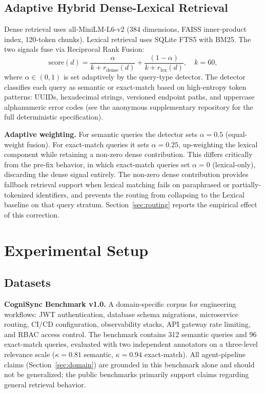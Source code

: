 \documentclass[sigconf]{acmart}
\begin{document}
\subsection{Adaptive Hybrid Dense-Lexical Retrieval}
\label{sec:retrieval_arch}

Dense retrieval uses all-MiniLM-L6-v2 (384 dimensions, FAISS
inner-product index, 120-token chunks). Lexical retrieval uses SQLite
FTS5 with BM25. The two signals fuse via Reciprocal Rank Fusion:
\begin{equation}
  \mathrm{score}(d) =
    \frac{\alpha}{k+r_{\mathrm{dense}}(d)}+
    \frac{(1-\alpha)}{k+r_{\mathrm{lex}}(d)},
    \quad k=60,
\end{equation}
where $\alpha \in (0,1)$ is set adaptively by the query-type detector.
The detector classifies each query as semantic or exact-match based on
high-entropy token patterns: UUIDs, hexadecimal strings, versioned
endpoint paths, and uppercase alphanumeric error codes (see
the anonymous supplementary repository for the full deterministic specification).

\textbf{Adaptive weighting.} For semantic queries the detector sets
$\alpha = 0.5$ (equal-weight fusion). For exact-match queries it sets
$\alpha = 0.25$, up-weighting the lexical component while retaining a
non-zero dense contribution. This differs critically from the pre-fix
behavior, in which exact-match queries set $\alpha = 0$ (lexical-only),
discarding the dense signal entirely. The non-zero dense contribution
provides fallback retrieval support when lexical matching fails on paraphrased or
partially-tokenized identifiers, and prevents the routing from collapsing
to the Lexical baseline on that query stratum. Section~\ref{sec:routing}
reports the empirical effect of this correction.

\section{Experimental Setup}

\subsection{Datasets}

\textbf{CogniSync Benchmark v1.0.} A domain-specific corpus for
engineering workflows: JWT authentication, database schema migrations,
microservice routing, CI/CD configuration, observability stacks, API
gateway rate limiting, and RBAC access control. The benchmark contains
312 semantic queries and 96 exact-match queries, evaluated with two
independent annotators on a three-level relevance scale
($\kappa = 0.81$ semantic, $\kappa = 0.94$ exact-match). All agent-pipeline
claims (Section~\ref{sec:domain}) are grounded in this benchmark alone and
should not be generalized; the public benchmarks primarily support claims regarding general retrieval behavior.
\end{document}
